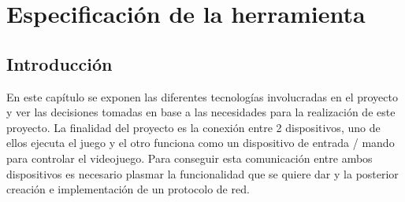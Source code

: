 %
%
%
%
%
%
%
%
%
%


\begin{FraseCelebre}
\begin{Frase}
\end{Frase}
\begin{Fuente}
\end{Fuente}
\end{FraseCelebre}


\chapter{Especificaci\'on de la herramienta}
\label{cap3}
\label{cap:especificacion}

\section{Introducci\'on}
\label{cap3:sec:intro}
En este cap\'itulo se exponen las diferentes tecnolog\'ias involucradas en el proyecto y ver las decisiones tomadas en base a las necesidades para la realizaci\'on de este proyecto. La finalidad del proyecto es la conexi\'on entre 2 dispositivos, uno de ellos ejecuta el juego y el otro funciona como un dispositivo de entrada / mando para controlar el videojuego. 
Para conseguir esta comunicaci\'on entre ambos dispositivos es necesario plasmar la funcionalidad que se quiere dar y la posterior creaci\'on e implementaci\'on de un protocolo de red.


